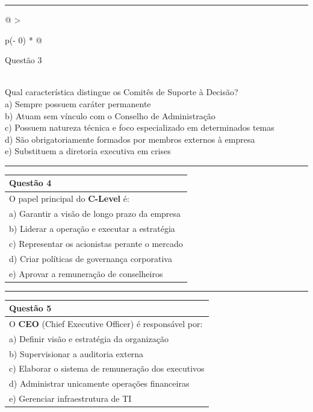 \documentclass[
]{book}
\begin{document}
\begin{center}\rule{0.5\linewidth}{0.5pt}\end{center}

\begin{longtable}[]{@{}
  >{\raggedright\arraybackslash}p{(\columnwidth - 0\tabcolsep) * }@{}}
\toprule\noalign{}
\begin{minipage}[b]{\linewidth}\raggedright
Questão 3
\end{minipage} \\
\midrule\noalign{}
\endhead
\bottomrule\noalign{}
\endlastfoot
Qual característica distingue os Comitês de Suporte à Decisão? \\
a) Sempre possuem caráter permanente \\
b) Atuam sem vínculo com o Conselho de Administração \\
c) Possuem natureza técnica e foco especializado em determinados temas \\
d) São obrigatoriamente formados por membros externos à empresa \\
e) Substituem a diretoria executiva em crises \\
\end{longtable}

\begin{center}\rule{0.5\linewidth}{0.5pt}\end{center}

\begin{longtable}[]{@{}l@{}}
\toprule\noalign{}
Questão 4 \\
\midrule\noalign{}
\endhead
\bottomrule\noalign{}
\endlastfoot
O papel principal do \textbf{C-Level} é: \\
a) Garantir a visão de longo prazo da empresa \\
b) Liderar a operação e executar a estratégia \\
c) Representar os acionistas perante o mercado \\
d) Criar políticas de governança corporativa \\
e) Aprovar a remuneração de conselheiros \\
\end{longtable}

\begin{center}\rule{0.5\linewidth}{0.5pt}\end{center}

\begin{longtable}[]{@{}l@{}}
\toprule\noalign{}
Questão 5 \\
\midrule\noalign{}
\endhead
\bottomrule\noalign{}
\endlastfoot
O \textbf{CEO} (Chief Executive Officer) é responsável por: \\
a) Definir visão e estratégia da organização \\
b) Supervisionar a auditoria externa \\
c) Elaborar o sistema de remuneração dos executivos \\
d) Administrar unicamente operações financeiras \\
e) Gerenciar infraestrutura de TI \\
\end{longtable}
\end{document}
